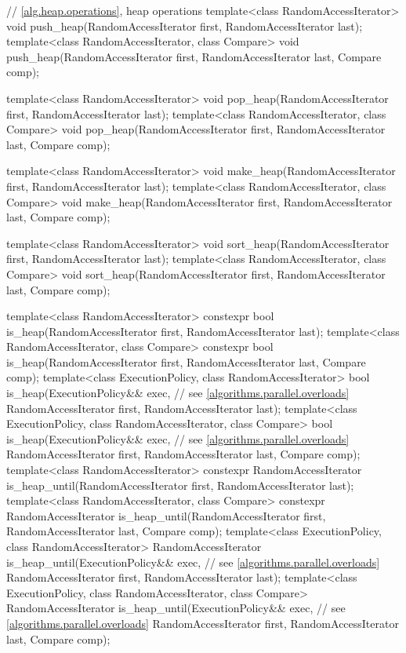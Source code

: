 \begin{codeblock}
{  // \ref{alg.heap.operations}, heap operations
  template<class RandomAccessIterator>
    void push_heap(RandomAccessIterator first, RandomAccessIterator last);
  template<class RandomAccessIterator, class Compare>
    void push_heap(RandomAccessIterator first, RandomAccessIterator last,
                   Compare comp);

  template<class RandomAccessIterator>
    void pop_heap(RandomAccessIterator first, RandomAccessIterator last);
  template<class RandomAccessIterator, class Compare>
    void pop_heap(RandomAccessIterator first, RandomAccessIterator last,
                  Compare comp);

  template<class RandomAccessIterator>
    void make_heap(RandomAccessIterator first, RandomAccessIterator last);
  template<class RandomAccessIterator, class Compare>
    void make_heap(RandomAccessIterator first, RandomAccessIterator last,
                   Compare comp);

  template<class RandomAccessIterator>
    void sort_heap(RandomAccessIterator first, RandomAccessIterator last);
  template<class RandomAccessIterator, class Compare>
    void sort_heap(RandomAccessIterator first, RandomAccessIterator last,
                   Compare comp);

  template<class RandomAccessIterator>
    constexpr bool is_heap(RandomAccessIterator first, RandomAccessIterator last);
  template<class RandomAccessIterator, class Compare>
    constexpr bool is_heap(RandomAccessIterator first, RandomAccessIterator last,
                           Compare comp);
  template<class ExecutionPolicy, class RandomAccessIterator>
    bool is_heap(ExecutionPolicy&& exec, // see \ref{algorithms.parallel.overloads}
                 RandomAccessIterator first, RandomAccessIterator last);
  template<class ExecutionPolicy, class RandomAccessIterator, class Compare>
    bool is_heap(ExecutionPolicy&& exec, // see \ref{algorithms.parallel.overloads}
                 RandomAccessIterator first, RandomAccessIterator last,
                 Compare comp);
  template<class RandomAccessIterator>
    constexpr RandomAccessIterator
      is_heap_until(RandomAccessIterator first, RandomAccessIterator last);
  template<class RandomAccessIterator, class Compare>
    constexpr RandomAccessIterator
      is_heap_until(RandomAccessIterator first, RandomAccessIterator last,
                    Compare comp);
  template<class ExecutionPolicy, class RandomAccessIterator>
    RandomAccessIterator
      is_heap_until(ExecutionPolicy&& exec, // see \ref{algorithms.parallel.overloads}
                    RandomAccessIterator first, RandomAccessIterator last);
  template<class ExecutionPolicy, class RandomAccessIterator, class Compare>
    RandomAccessIterator
      is_heap_until(ExecutionPolicy&& exec, // see \ref{algorithms.parallel.overloads}
                    RandomAccessIterator first, RandomAccessIterator last,
                    Compare comp);

}
\end{codeblock}
